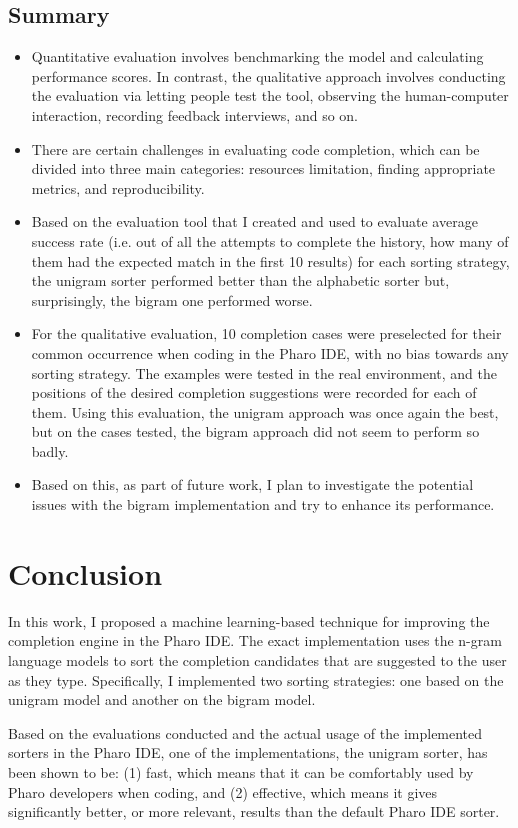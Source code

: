 \documentclass[sigplan,screen]{acmart}
\begin{document}
\subsection{Summary}
\begin{itemize}
    \item Quantitative evaluation involves benchmarking the model and calculating performance scores. In contrast, the qualitative approach involves conducting the evaluation via letting people test the tool, observing the human-computer interaction, recording feedback interviews, and so on.
    \item There are certain challenges in evaluating code completion, which can be divided into three main categories: resources limitation, finding appropriate metrics, and reproducibility.
    \item Based on the evaluation tool that I created and used to evaluate average success rate (i.e. out of all the attempts to complete the history, how many of them had the expected match in the first 10 results) for each sorting strategy, the unigram sorter performed better than the alphabetic sorter but, surprisingly, the bigram one performed worse.
    \item For the qualitative evaluation, 10 completion cases were preselected for their common occurrence when coding in the Pharo IDE, with no bias towards any sorting strategy. The examples were tested in the real environment, and the positions of the desired completion suggestions were recorded for each of them. Using this evaluation, the unigram approach was once again the best, but on the cases tested, the bigram approach did not seem to perform so badly.
    \item Based on this, as part of future work, I plan to investigate the potential issues with the bigram implementation and try to enhance its performance.
\end{itemize}

\section{Conclusion}
In this work, I proposed a machine learning-based technique for improving the completion engine in the Pharo IDE. The exact implementation uses the n-gram language models to sort the completion candidates that are suggested to the user as they type. Specifically, I implemented two sorting strategies: one based on the unigram model and another on the bigram model.

Based on the evaluations conducted and the actual usage of the implemented sorters in the Pharo IDE, one of the implementations, the unigram sorter, has been shown to be: (1) fast, which means that it can be comfortably used by Pharo developers when coding, and (2) effective, which means it gives significantly better, or more relevant, results than the default Pharo IDE sorter.
\end{document}
